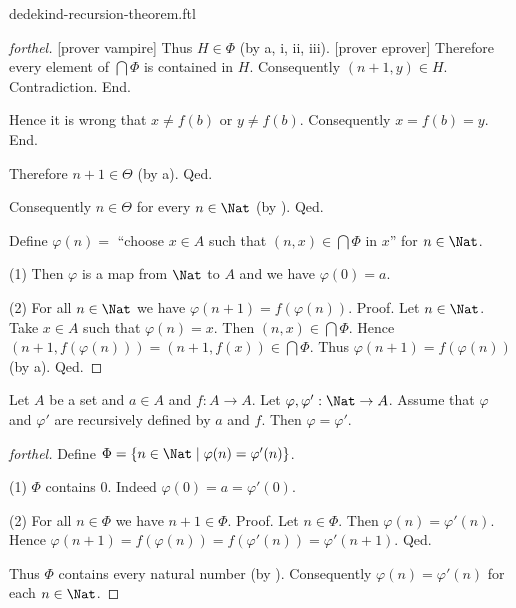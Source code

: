 \documentclass{naproche-library}
\begin{document}
\begin{smodule}[title=Dedekind's Recursion Theorem]{dedekind-recursion-theorem.ftl}
\begin{proof}[forthel]
          [prover vampire]
          Thus $H \in \Phi$ (by a, i, ii, iii).
          [prover eprover]
          Therefore every element of $\bigcap \Phi$ is contained in $H$.
          Consequently $(n + 1,y) \in H$.
          Contradiction.
        End.

        Hence it is wrong that $x \neq f(b)$ or $y \neq f(b)$.
        Consequently $x = f(b) = y$.
      End.

      Therefore $n + 1 \in \Theta$ (by a).
    Qed.

    Consequently $n \in \Theta$ for every $n \in \Nat$ (by ).
  Qed.

  Define $\varphi(n) =$ ``choose $x \in A$ such that $(n, x) \in
  \bigcap \Phi$ in $x$'' for $n \in \Nat$.

  (1) Then $\varphi$ is a map from $\Nat$ to $A$ and we have
  $\varphi(0) = a$.

  (2) For all $n \in \Nat$ we have $\varphi(n + 1) =
  f(\varphi(n))$. \newline
  Proof.
    Let $n \in \Nat$.
    Take $x \in A$ such that $\varphi(n) = x$.
    Then $(n, x) \in \bigcap \Phi$.
    Hence $(n + 1, f(\varphi(n))) = (n + 1, f(x)) \in \bigcap \Phi$.
    Thus $\varphi(n + 1) = f(\varphi(n))$ (by a).
  Qed.
\end{proof}

\begin{theorem}[forthel,title=Dedekind's Recursion Theorem: Uniqueness,id=dedekind_uniqueness]
  Let $A$ be a set and $a \in A$ and $f : A \to A$.
  Let $\varphi, \varphi' : \Nat \to A$.
  Assume that $\varphi$ and $\varphi'$ are recursively defined by $a$ and
  $f$.
  Then $\varphi = \varphi'$.
\end{theorem}
\begin{proof}[forthel]
  Define $\Phi = \{ n \in \Nat \mid \varphi(n) = \varphi'(n) \}$.

  (1) $\Phi$ contains $0$.
  Indeed $\varphi(0) = a = \varphi'(0)$.

  (2) For all $n \in \Phi$ we have $n + 1 \in \Phi$. \newline
  Proof.
    Let $n \in \Phi$.
    Then $\varphi(n) = \varphi'(n)$.
    Hence $\varphi(n + 1)
      = f(\varphi(n))
      = f(\varphi'(n))
      = \varphi'(n + 1)$.
  Qed.

  Thus $\Phi$ contains every natural number (by ).
  Consequently $\varphi(n) = \varphi'(n)$ for each $n \in \Nat$.
\end{proof}
\end{smodule}
\end{document}
